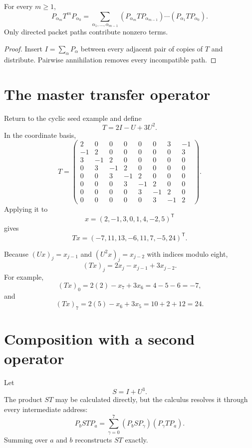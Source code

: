 \begin{theorem}\label{thm:path-power}
For every $m\ge1$,
\[
\boxed{
P_{\alpha_m}T^mP_{\alpha_0}
=
\sum_{\alpha_1,\ldots,\alpha_{m-1}}
(P_{\alpha_m}TP_{\alpha_{m-1}})\cdots
(P_{\alpha_1}TP_{\alpha_0}).
}
\]
Only directed packet paths contribute nonzero terms.
\end{theorem}

\begin{proof}
Insert $I=\sum_\alpha P_\alpha$ between every adjacent pair of copies of $T$ and distribute.  Pairwise annihilation removes every incompatible path.
\end{proof}

\section{The master transfer operator}
Return to the cyclic seed example and define
\[
T=2I-U+3U^2.
\]
In the coordinate basis,
\[
T=
\begin{pmatrix}
2&0&0&0&0&0&3&-1\\
-1&2&0&0&0&0&0&3\\
3&-1&2&0&0&0&0&0\\
0&3&-1&2&0&0&0&0\\
0&0&3&-1&2&0&0&0\\
0&0&0&3&-1&2&0&0\\
0&0&0&0&3&-1&2&0\\
0&0&0&0&0&3&-1&2
\end{pmatrix}.
\]
Applying it to
\[
x=(2,-1,3,0,1,4,-2,5)^{\mathsf T}
\]
gives
\[
\boxed{
Tx=(-7,11,13,-6,11,7,-5,24)^{\mathsf T}.
}
\]

\begin{calculationbox}
Because $(Ux)_j=x_{j-1}$ and $(U^2x)_j=x_{j-2}$ with indices modulo eight,
\[
(Tx)_j=2x_j-x_{j-1}+3x_{j-2}.
\]
For example,
\[
(Tx)_0=2(2)-x_7+3x_6=4-5-6=-7,
\]
and
\[
(Tx)_7=2(5)-x_6+3x_5=10+2+12=24.
\]
\end{calculationbox}



\section{Composition with a second operator}
Let
\[
S=I+U^3.
\]
The product $ST$ may be calculated directly, but the calculus resolves it through every intermediate address:
\[
P_bSTP_a
=
\sum_{\gamma=0}^{7}
(P_bSP_\gamma)(P_\gamma TP_a).
\]
Summing over $a$ and $b$ reconstructs $ST$ exactly.

